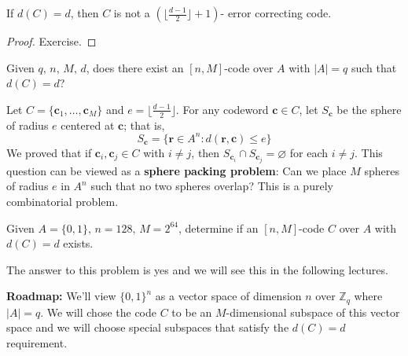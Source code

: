 \begin{thmbox}
    \begin{theorem}
        If $ d(C)=d $, then $ C $ is not a $ \left( \lfloor \frac{d-1}{2}\rfloor +1 \right) $-
        error correcting code.
    \end{theorem} \end{thmbox}

\begin{proof}
    Exercise.
\end{proof}

Given $ q,\,n,\,M,\,d $, does there exist an $ [n,M] $-code over $ A $
with $ |A|=q $ such that $ d(C)=d $?

Let $ C=\{\bm{c}_1,\ldots ,\bm{c}_M\} $ and $ e=\lfloor \frac{d-1}{2} \rfloor $.
For any codeword $ \bm{c}\in C $, let $ S_{\bm{c}} $ be the sphere of radius $ e $ centered at
$ \bm{c} $;
that is,
\[ S_{\bm{c}}= \{\bm{r}\in A^n:d(\bm{r},\bm{c})\leqslant e\} \]
We proved that if $ \bm{c}_i,\bm{c}_j\in C $ with $ i\neq j $,
then $ S_{\bm{c}_i}\cap S_{\bm{c}_j}= \varnothing $ for each $ i\neq j $.
This question can be viewed as a \textbf{sphere packing problem}:
Can we place $ M $ spheres of radius $ e $ in $ A^n $ such that
no two spheres overlap? This is a purely combinatorial problem.

Given $ A=\{0,1\},\,n=128,\,M=2^{64} $, determine
if an $ [n,M] $-code $ C $ over $ A $ with $ d(C)=d $ exists.

The answer to this problem is yes and we will see this in the following lectures.

\textbf{Roadmap:} We'll view $ \{0,1\}^{n} $ as a vector space of
dimension $ n $ over $ \mathbb{Z}_q $ where $ |A|=q $. We will chose the code
$ C $ to be an $ M $-dimensional subspace of this vector space
and we will choose special subspaces that satisfy the $ d(C)=d $ requirement.
